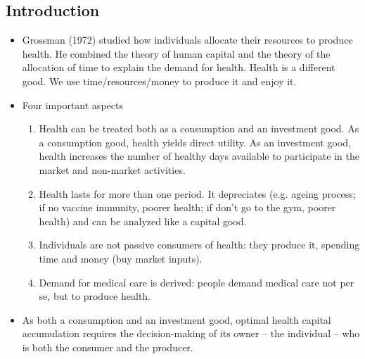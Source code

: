 \subsection{Introduction}
\begin{itemize}
        \item Grossman (1972) studied how individuals allocate their resources to produce health. He combined the theory of human capital and the theory of the allocation of time to explain the demand for health. Health is a different good. We use time/resources/money to produce it and enjoy it.
        \item Four important aspects
        \begin{enumerate}
                \item Health can be treated both as a consumption and an investment good. As a consumption good, health yields direct utility. As an investment good, health increases the number of healthy days available to participate in the market and non-market activities.
                \item Health lasts for more than one period. It depreciates (e.g. ageing process; if no vaccine immunity, poorer health; if don't go to the gym, poorer health) and can be analyzed like a capital good.
                \item Individuals are not passive consumers of health: they produce it, spending time and money (buy market inputs).
                \item Demand for medical care is derived: people demand medical care not per se, but to produce health.
            \end{enumerate}
        \item As both a consumption and an investment good, optimal health capital accumulation requires the decision-making of its owner – the individual – who is both the consumer and the producer.    
\end{itemize}        

